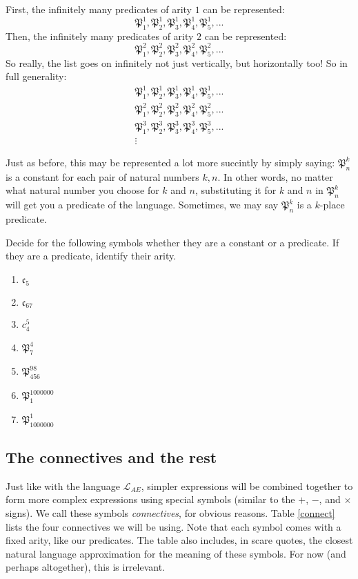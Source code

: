 First, the infinitely many predicates of arity $1$ can be represented:
\[
\mathfrak{P}^1_1, \mathfrak{P}^1_2, \mathfrak{P}^1_3, \mathfrak{P}^1_4, \mathfrak{P}^1_5, ...
\]
Then, the infinitely many predicates of arity $2$ can be represented: 
\[
\mathfrak{P}^2_1, \mathfrak{P}^2_2, \mathfrak{P}^2_3, \mathfrak{P}^2_4, \mathfrak{P}^2_5, ...
\]
So really, the list goes on infinitely not just vertically, but horizontally too! So in full generality: 
\begin{gather*}
\mathfrak{P}^1_1, \mathfrak{P}^1_2, \mathfrak{P}^1_3, \mathfrak{P}^1_4, \mathfrak{P}^1_5, ...\\
\mathfrak{P}^2_1, \mathfrak{P}^2_2, \mathfrak{P}^2_3, \mathfrak{P}^2_4, \mathfrak{P}^2_5, ...\\
\mathfrak{P}^3_1, \mathfrak{P}^3_2, \mathfrak{P}^3_3, \mathfrak{P}^3_4, \mathfrak{P}^3_5, ...\\
\vdots
\end{gather*}

Just as before, this may be represented a lot more succintly by simply saying: $\mathfrak{P}^k_n$ is a constant for each pair of natural numbers $k, n$. In other words, no matter what natural number you choose for $k$ and $n$, substituting it for $k$ and $n$ in $\mathfrak{P}^k_n$ will get you a predicate of the language. Sometimes, we may say $\mathfrak{P}^k_n$ is a $k$-place predicate. 

\begin{exc}
Decide for the following symbols whether they are a constant or a predicate. If they are a predicate, identify their arity. 

\begin{enumerate}
	\item $\mathfrak{c}_5$
	\item $\mathfrak{c}_{67}$
	\item $c^5_4$
	\item $\mathfrak{P}^4_7$
	\item $\mathfrak{P}^{98}_{456}$
	\item $\mathfrak{P}^{1000000}_1$
	\item $\mathfrak{P}_{1000000}^1$
\end{enumerate}
\end{exc}

\subsection{The connectives and the rest}

Just like with the language $\mathcal{L}_{AE}$, simpler expressions will be combined together to form more complex expressions using special symbols (similar to the $+$, $-$, and $\times$ signs). We call these symbols \textit{connectives}, for obvious reasons. Table \ref{connect} lists the four connectives we will be using. Note that each symbol comes with a fixed arity, like our predicates. The table also includes, in scare quotes, the closest natural language approximation for the meaning of these symbols. For now (and perhaps altogether), this is irrelevant. 


